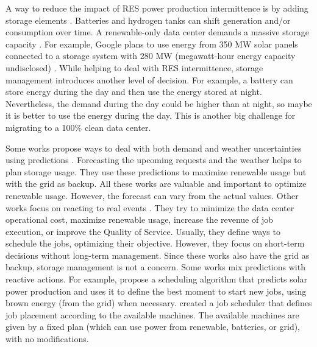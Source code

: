A way to reduce the impact of RES power production intermittence is by adding storage elements \cite{rostirolla2022survey}. Batteries and hydrogen tanks can shift generation and/or consumption over time. A renewable-only data center demands a massive storage capacity \cite{rostirolla2022survey}. For example, Google plans to use energy from 350 MW solar panels connected to a storage system with 280 MW (megawatt-hour energy capacity undisclosed) \cite{branscombe2020google}. While helping to deal with RES intermittence, storage management introduces another level of decision. For example, a battery can store energy during the day and then use the energy stored at night. Nevertheless, the demand during the day could be higher than at night, so maybe it is better to use the energy during the day. This is another big challenge for migrating to a 100\% clean data center.

Some works propose ways to deal with both demand and weather uncertainties using predictions \cite{wiesner2022cucumber, haddad2019mixed, lu_energy-efficient_2018, goiri2015matching}. Forecasting the upcoming requests and the weather helps to plan storage usage. They use these predictions to maximize renewable usage but with the grid as backup. All these works are valuable and important to optimize renewable usage. However, the forecast can vary from the actual values. Other works focus on reacting to real events \cite{liu2023online, he2022online, caux2019phase, sharma2011blink}. They try to minimize the data center operational cost, maximize renewable usage, increase the revenue of job execution, or improve the Quality of Service. Usually, they define ways to schedule the jobs, optimizing their objective. However, they focus on short-term decisions without long-term management. Since these works also have the grid as backup, storage management is not a concern. Some works mix predictions with reactive actions. For example, \citeauthor{goiri2015matching} \cite{goiri2015matching} propose a scheduling algorithm that predicts solar power production and uses it to define the best moment to start new jobs, using brown energy (from the grid) when necessary. \citeauthor{venkataswamy2023rare} \cite{venkataswamy2023rare} created a job scheduler that defines job placement according to the available machines. The available machines are given by a fixed plan (which can use power from renewable, batteries, or grid), with no modifications.

